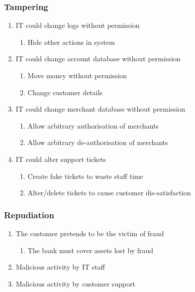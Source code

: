 \subsubsection{Tampering}

\begin{enumerate}[resume]
    \item IT could change logs without permission
    \begin{enumerate}
        \item Hide other actions in system
    \end{enumerate}

    \item IT could change account database without permission
    \begin{enumerate}
        \item Move money without permission
        \item Change customer details
    \end{enumerate}

    \item IT could change merchant database without permission
    \begin{enumerate}
        \item Allow arbitrary authorisation of merchants
        \item Allow arbitrary de-authorisation of merchants
    \end{enumerate}

    \item IT could alter support tickets
    \begin{enumerate}
        \item Create fake tickets to waste staff time
        \item Alter/delete tickets to cause customer dis-satisfaction
    \end{enumerate}
\end{enumerate}

\subsubsection{Repudiation}

\begin{enumerate}[resume]
    \item The customer pretends to be the victim of fraud
    \begin{enumerate}
        \item The bank must cover assets lost by fraud
    \end{enumerate}

    \item Malicious activity by IT staff
    \item Malicious activity by customer support
\end{enumerate}


